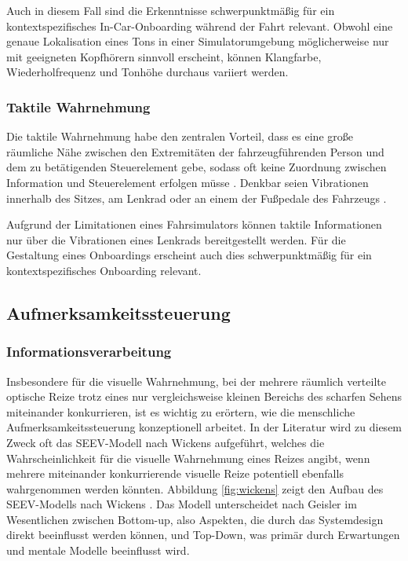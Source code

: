 Auch in diesem Fall sind die Erkenntnisse schwerpunktmäßig für ein kontextspezifisches In-Car-Onboarding während der Fahrt relevant. Obwohl eine genaue Lokalisation eines Tons in einer Simulatorumgebung möglicherweise nur mit geeigneten Kopfhörern sinnvoll erscheint, können Klangfarbe, Wiederholfrequenz und Tonhöhe durchaus variiert werden.

\subsubsection{Taktile Wahrnehmung}
\label{subsubsec:taktile_wahrnehmung}
Die taktile Wahrnehmung habe den zentralen Vorteil, dass es eine große räumliche Nähe zwischen den Extremitäten der fahrzeugführenden Person und dem zu betätigenden Steuerelement gebe, sodass oft keine Zuordnung zwischen Information und 	Steuerelement erfolgen müsse \cite{Geisler_hci2021}. Denkbar seien Vibrationen innerhalb des Sitzes, am Lenkrad oder an einem der Fußpedale des Fahrzeugs \cite{Geisler_hci2021}. 

Aufgrund der Limitationen eines Fahrsimulators können taktile Informationen nur über die Vibrationen eines Lenkrads bereitgestellt werden. Für die Gestaltung eines Onboardings erscheint auch dies schwerpunktmäßig für ein kontextspezifisches Onboarding relevant. 

\subsection{Aufmerksamkeitssteuerung}
\label{subsec:aufmerksamkeitssteuerung}

\subsubsection{Informationsverarbeitung}
\label{subsubsec:informationsverarbeitung}
Insbesondere für die visuelle Wahrnehmung, bei der mehrere räumlich verteilte optische Reize trotz eines nur vergleichsweise kleinen Bereichs des scharfen Sehens miteinander konkurrieren, ist es wichtig zu erörtern, wie die menschliche Aufmerksamkeitssteuerung konzeptionell arbeitet. In der Literatur \cite{Geisler_hci2021} wird zu diesem Zweck oft das SEEV-Modell nach Wickens \cite{Wickens2008} aufgeführt, welches die Wahrscheinlichkeit für die visuelle Wahrnehmung eines Reizes angibt, wenn mehrere miteinander konkurrierende visuelle Reize potentiell ebenfalls wahrgenommen werden könnten. Abbildung \ref{fig:wickens} zeigt den Aufbau des SEEV-Modells nach Wickens \cite{Wickens2008}. Das Modell unterscheidet nach Geisler \cite{Geisler_hci2021} im Wesentlichen zwischen Bottom-up, also Aspekten, die durch das Systemdesign direkt beeinflusst werden können, und Top-Down, was primär durch Erwartungen und mentale Modelle beeinflusst wird.

